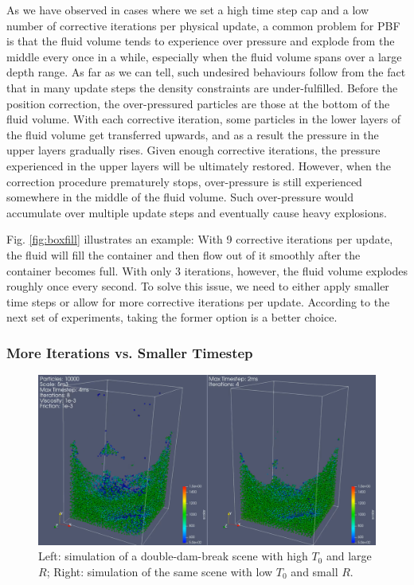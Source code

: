 \documentclass[
	11pt, 
	DIV10,
	ngerman,
	a4paper, 
	oneside, 
	headings=normal, 
	captions=tableheading,
	final, 
	numbers=noenddot
]{scrartcl}
\begin{document}
As we have observed in cases where we set a high time step cap and a low number of corrective iterations per physical update, a common problem for PBF is that the fluid volume tends to experience over pressure and explode from the middle every once in a while, especially when the fluid volume spans over a large depth range. As far as we can tell, such undesired behaviours follow from the fact that in many update steps the density constraints are under-fulfilled. Before the position correction, the over-pressured particles are those at the bottom of the fluid volume. With each corrective iteration, some particles in the lower layers of the fluid volume get transferred upwards, and as a result the pressure in the upper layers gradually rises. Given enough corrective iterations, the pressure experienced in the upper layers will be ultimately restored. However, when the correction procedure prematurely stops, over-pressure is still experienced somewhere in the middle of the fluid volume. Such over-pressure would accumulate over multiple update steps and eventually cause heavy explosions.

Fig. \ref{fig:boxfill} illustrates an example: With 9 corrective iterations per update, the fluid will fill the container and then flow out of it smoothly after the container becomes full. With only 3 iterations, however, the fluid volume explodes roughly once every second. To solve this issue, we need to either apply smaller time steps or allow for more corrective iterations per update. According to the next set of experiments, taking the former option is a better choice.

\subsubsection{More Iterations vs. Smaller Timestep}

\begin{figure}
    \centering
    \includegraphics[width=.6\textwidth]{pics/pbf_iter_ts.png}
    \caption{Left: simulation of a double-dam-break scene with high $ T_{0} $ and large $ R $; Right: simulation of the same scene with low $ T_{0} $ and small $ R $.}
    \label{fig:doubleDam}
\end{figure}
\end{document}
